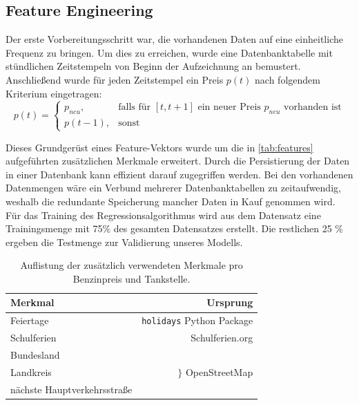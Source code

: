 \documentclass[
ngerman          %
,a4paper          %
,11pt
,pdftex
]{report}
\begin{document}
\subsection{Feature Engineering} 
Der erste Vorbereitungsschritt war, die vorhandenen Daten auf eine einheitliche Frequenz zu bringen. Um dies zu erreichen, wurde eine Datenbanktabelle mit stündlichen Zeitstempeln von Beginn der Aufzeichnung an bemustert. Anschließend wurde für jeden Zeitstempel ein Preis $p(t)$ nach folgendem Kriterium eingetragen:
\begin{equation*}
p(t) = \begin{cases}
p_{neu}, & \text{falls für } [t, t+1] \text{ ein neuer Preis $p_{neu}$ vorhanden ist}\\
p(t-1), & \text{sonst} 
\end{cases}
\end{equation*}

Dieses Grundgerüst eines Feature-Vektors wurde um die in \autoref{tab:features} aufgeführten zusätzlichen Merkmale erweitert. Durch die Persistierung der Daten in einer Datenbank kann effizient darauf zugegriffen werden. Bei den vorhandenen Datenmengen wäre ein Verbund mehrerer Datenbanktabellen zu zeitaufwendig, weshalb die redundante Speicherung mancher Daten in Kauf genommen wird. Für das Training des Regressionsalgorithmus wird aus dem Datensatz eine Trainingsmenge mit 75\% des gesamten Datensatzes erstellt. Die restlichen 25 \% ergeben die Testmenge zur Validierung unseres Modells.

\begin{table}
	\centering
	\begin{tabular}{l r}
		\textbf{Merkmal} & \textbf{Ursprung} \\ 
		\hline \hline
		Feiertage & \texttt{holidays} Python Package  \cite{holidays} \\ 
		Schulferien &  Schulferien.org \cite{ferien} \\ 
		Bundesland & 
        \multirow{3}{*}{ $\Bigg\}$ OpenStreetMap \cite{osm}}\\
        Landkreis &\\
        nächste Hauptverkehrsstraße & \\
		\hline 
	\end{tabular}
	\caption{Auflistung der zusätzlich verwendeten Merkmale pro Benzinpreis und Tankstelle.}
	\label{tab:features}	
\end{table} 
\end{document}
